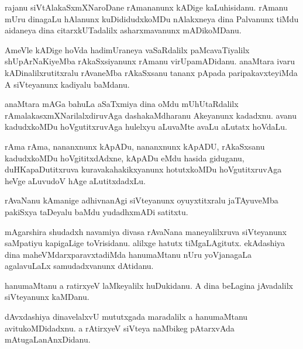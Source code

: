 \documentclass{article}
\begin{document}
\begin{mn}%
rajanu siVtAlakaSxmXNaroDane rAmananunx kADige kaLuhisidanu. rAmanu mUru dinagaLu hAlanunx 
kuDididudxkoMDu nAlakxneya dina Palvanunx tiMdu aidaneya dina citarxkUTadalilx 
asharxmavanunx mADikoMDanu.
\end{mn}

\begin{mn}%
AmeVle kADige hoVda hadimUraneya vaSaRdalilx paMcavaTiyalilx shUpArNaKiyeMba 
rAkaSxsiyanunx rAmanu virUpamADidanu. anaMtara ivaru kADinalilxrutitxralu rAvaneMba 
rAkaSxsanu tananx pApada paripakavxteyiMda A siVteyanunx kadiyalu baMdanu.
\end{mn}

\begin{mn}%
anaMtara mAGa bahuLa aSaTxmiya dina oMdu mUhUtaRdalilx rAmalakasxmXNarilalxdiruvAga 
dashakaMdharanu Akeyanunx kadadxnu. avanu kadudxkoMDu hoVgutitxruvAga hulelxyu aLuvaMte 
avaLu aLutatx hoVdaLu.
\end{mn}

\begin{mn}%
rAma rAma, nananxnunx kApADu, nananxnunx kApADU, rAkaSxsanu kadudxkoMDu hoVgititxdAdxne, 
kApADu eMdu hasida giduganu, duHKapaDutitxruva kuravakahakikxyanunx hotutxkoMDu 
hoVgutitxruvAga heVge aLuvudoV hAge aLutitxdadxLu.
\end{mn}

\begin{mn}%
rAvaNanu kAmanige adhivnanAgi siVteyanunx oyuyxtitxralu jaTAyuveMba pakiSxya taDeyalu 
baMdu yudadhxmADi satitxtu.
\end{mn}

\begin{mn}%
mAgarshira shudadxh navamiya divasa rAvaNana maneyalilxruva siVteyanunx saMpatiyu 
kapigaLige toVrisidanu. alilxge hatutx tiMgaLAgitutx. ekAdashiya dina 
maheVMdarxparavxtadiMda hanumaMtanu nUru yoVjanagaLa agalavuLaLx samudadxvanunx dAtidanu.
\end{mn}

\begin{mn}%
hanumaMtanu a ratirxyeV laMkeyalilx huDukidanu. A dina beLagina jAvadalilx siVteyanunx 
kaMDanu.
\end{mn}

\begin{mn}%
dAvxdashiya dinavelalxvU mututxgada maradalilx a hanumaMtanu avitukoMDidadxnu. a rAtirxyeV 
siVteya naMbikeg pAtarxvAda mAtugaLanAnxDidanu.
\end{mn}
\end{document}
